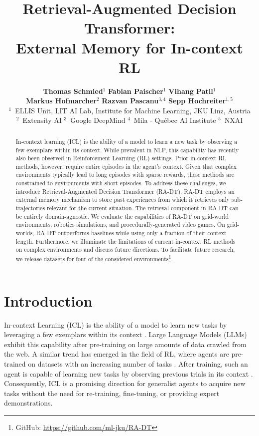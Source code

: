 \documentclass{article} %
\title{Retrieval-Augmented Decision Transformer: \\External Memory for In-context RL}
\author{
  \textbf{Thomas Schmied}$^{1}$\qquad
  \textbf{Fabian Paischer}$^{1}$\qquad
  \textbf{Vihang Patil}$^{1}$\qquad\\
  \;\textbf{Markus Hofmarcher}$^{2}$\qquad
  \textbf{Razvan Pascanu}$^{3,4}$\qquad
  \textbf{Sepp Hochreiter}$^{1,5}$ \\
  $^{1}$~ELLIS Unit, LIT AI Lab, Institute for Machine Learning, JKU Linz, Austria\\
  $^{2}$~Extensity AI\; $^{3}$~Google DeepMind\; $^{4}$~Mila - Québec AI Institute\; $^{5}$~NXAI
}
\newcommand{\stoptocwriting}{\addtocontents{toc}{\protect\setcounter{tocdepth}{0}}}
\begin{document}
\stoptocwriting

\maketitle

\begin{abstract}
In-context learning (ICL) is the ability of a model to learn a new task by observing a few exemplars within its context. 
While prevalent in NLP, this capability has recently also been observed in Reinforcement Learning (RL) settings.
Prior in-context RL methods, however, require entire episodes in the agent's context.
Given that complex environments typically lead to
long episodes with sparse rewards, these methods are constrained to environments with short episodes. 
To address these challenges, we introduce Retrieval-Augmented Decision Transformer (RA-DT).
RA-DT employs an external memory mechanism to store past experiences from which it retrieves only sub-trajectories relevant for the current situation.
The retrieval component in RA-DT can be entirely domain-agnostic.
We evaluate the capabilities of RA-DT on grid-world environments, robotics simulations, and procedurally-generated video games.
On grid-worlds, RA-DT outperforms baselines while using only a fraction of their context length.
Furthermore, we illuminate the limitations of current in-context RL methods on complex environments and discuss future directions. To facilitate future research, we release datasets for four of the considered environments\footnote{GitHub: \url{https://github.com/ml-jku/RA-DT}}.
\end{abstract}

\section{Introduction}
In-context Learning (ICL) is the ability of a model to learn new tasks by leveraging a few exemplars within its context \citep{Brown:20}.
Large Language Models (LLMs) exhibit this capability after pre-training on large amounts of data crawled from the web.
A similar trend has emerged in the field of RL, where agents are pre-trained on datasets with an increasing number of tasks \citep{Chen:21, Janner:21, Reed:22,Lee:22,Brohan:22, Brohan:23}.
After training, such an agent is capable of learning new tasks by observing previous trials in its context \citep{Laskin:22,Liu:23,Lee:23, Raparthy:23}.
Consequently, ICL is a promising direction for generalist agents to acquire new tasks without the need for re-training, fine-tuning, or providing expert demonstrations. 
\end{document}

